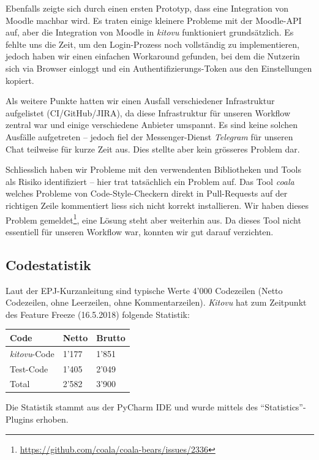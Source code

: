 \documentclass[a4paper]{article}
\begin{document}
Ebenfalls zeigte sich durch einen ersten Prototyp, dass eine Integration von
Moodle machbar wird. Es traten einige kleinere Probleme mit der Moodle-API auf,
aber die Integration von Moodle in \emph{kitovu} funktioniert grundsätzlich. Es
fehlte uns die Zeit, um den Login-Prozess noch vollständig zu implementieren,
jedoch haben wir einen einfachen Workaround gefunden, bei dem die Nutzerin sich
via Browser einloggt und ein Authentifizierungs-Token aus den Einstellungen kopiert.

Als weitere Punkte hatten wir einen Ausfall verschiedener Infrastruktur
aufgelistet (CI/GitHub/JIRA), da diese Infrastruktur für unseren Workflow
zentral war und einige verschiedene Anbieter umspannt. Es sind keine solchen
Ausfälle aufgetreten -- jedoch fiel der Messenger-Dienst \emph{Telegram} für
unseren Chat teilweise für kurze Zeit aus. Dies stellte aber kein grösseres
Problem dar.

Schliesslich haben wir Probleme mit den verwendenten Bibliotheken und Tools
als Risiko identifiziert -- hier trat tatsächlich ein Problem auf. Das Tool
\emph{coala} welches Probleme von Code-Style-Checkern direkt in
Pull-Requests auf der richtigen Zeile kommentiert liess sich nicht korrekt
installieren. Wir haben dieses Problem
gemeldet\footnote{\url{https://github.com/coala/coala-bears/issues/2336}}, eine
Lösung steht aber weiterhin aus. Da dieses Tool nicht essentiell für unseren
Workflow war, konnten wir gut darauf verzichten.

\subsection{Codestatistik}

Laut der EPJ-Kurzanleitung sind typische Werte 4'000 Codezeilen (Netto Codezeilen, ohne Leerzeilen, ohne Kommentarzeilen). \emph{Kitovu} hat zum Zeitpunkt des Feature Freeze (16.5.2018) folgende Statistik:

\begin{tabulary}{\linewidth}{lll}
  \toprule
  \textbf{Code} & \textbf{Netto} & \textbf{Brutto} \\
  \midrule
  \emph{kitovu}-Code & 1'177 & 1'851 \\
  Test-Code & 1'405 & 2'049 \\
  \midrule
  Total & 2'582 & 3'900 \\
  \bottomrule
\end{tabulary}

Die Statistik stammt aus der PyCharm IDE und wurde mittels des ``Statistics''-Plugins erhoben.
\end{document}
